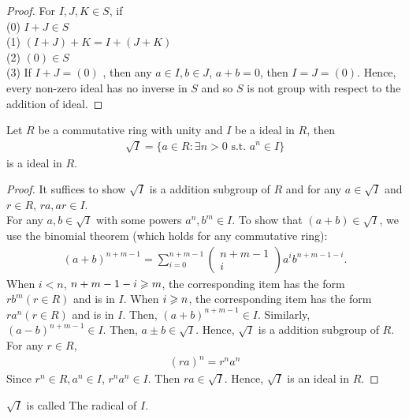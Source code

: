 \begin{proof}
    For $I, J, K\in S$, if \\
    (0) $I+J\in S$\\
    (1) $(I+J)+K=I+(J+K)$\\
    (2) $(0)\in S$\\
    (3) If $I+J=(0)$ , then any $a\in I,b\in J$, $a+b=0$, then $I=J=(0)$.
    Hence, every non-zero ideal has no inverse in $S$ and so $S$ 
    is not group with respect to the addition of ideal.
\end{proof}

\begin{exercise}{}{}
    Let $R$ be a commutative ring with unity and $I$ be a ideal in $R$, then
    \begin{align*}
        \sqrt{I} = \{a\in R:\exists n>0 \text{ s.t. } a^n\in I\}
    \end{align*}
    is a ideal in $R$.
\end{exercise}
\begin{proof}
    It suffices to show $\sqrt{I}$ is a addition subgroup of $R$ and 
    for any $a\in \sqrt{I}$ and $r\in R$, $ra,ar\in I$.\\
    For any $a,b\in\sqrt{I}$ with some powers $a^n,b^m\in I$. To show that 
    $(a+b)\in \sqrt{I}$, we use the binomial theorem (which holds for any commutative ring):
    \begin{align*}
        (a+b)^{n+m-1}=\sum\limits_{i=0}^{n+m-1}
        \begin{pmatrix}
            n+m-1\\
           i
           \end{pmatrix} a^ib^{n+m-1-i}.
    \end{align*}
    When $i<n$, $n+m-1-i\geqslant m$, the corresponding item has the form $rb^m(r\in R)$ and is in $I$.
    When $i\geqslant n$, the corresponding item has the form $ra^n(r\in R)$ and is in $I$.
    Then, $(a+b)^{n+m-1}\in I$. Similarly, $(a-b)^{n+m-1}\in I$.
    Then, $a\pm b\in\sqrt{I}$.
    Hence, $\sqrt{I}$ is a addition subgroup of $R$.
    For any $r\in R$, 
    \begin{align*}
        (ra)^n = r^na^n
    \end{align*}
    Since $r^n\in R, a^n\in I$, $r^na^n\in I$.
    Then $ra\in \sqrt{I}$.
    Hence, $\sqrt{I}$ is an ideal in $R$. 
\end{proof}

\begin{remark}
    $\sqrt{I}$ is called The radical of $I$.
\end{remark}

